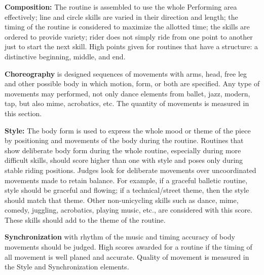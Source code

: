 \textbf{Composition:} The routine is assembled to use the whole Performing area effectively; line and circle skills are varied in their direction and length; the timing of the routine is considered to maximize the allotted time; the skills are ordered to provide variety; rider does not simply ride from one point to another just to start the next skill.
High points given for routines that have a structure: a distinctive beginning, middle, and end.

\textbf{Choreography} is designed sequences of movements with arms, head, free leg and other possible body in which motion, form, or both are specified.
Any type of movements may performed, not only dance elements from ballet, jazz, modern, tap, but also mime, acrobatics, etc.
The quantity of movements is measured in this section.

\textbf{Style:} The body form is used to express the whole mood or theme of the piece by positioning and movements of the body during the routine.
Routines that show deliberate body form during the whole routine, especially during more difficult skills, should score higher than one with style and poses only during stable riding positions.
Judges look for deliberate movements over uncoordinated movements made to retain balance.
For example, if a graceful balletic routine, style should be graceful and flowing; if a technical/street theme, then the style should match that theme.
Other non-unicycling skills such as dance, mime, comedy, juggling, acrobatics, playing music, etc., are considered with this score.
These skills should add to the theme of the routine.

\textbf{Synchronization} with rhythm of the music and timing accuracy of body movements should be judged.
High scores awarded for a routine if the timing of all movement is well planed and accurate.
Quality of movement is measured in the Style and Synchronization elements.

